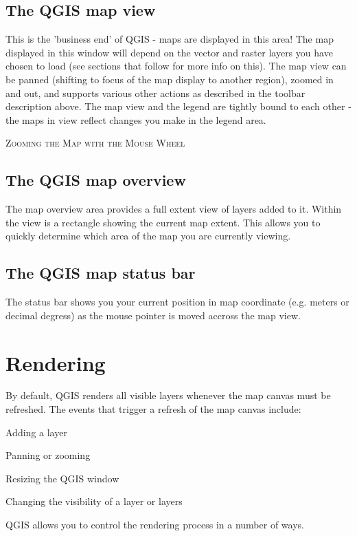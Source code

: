 \subsection{The QGIS map view}
This is the 'business end' of QGIS - maps are displayed in this area! The map
displayed in this window will depend on the vector and raster layers you have
chosen to load (see sections that follow for more info on this). The map view
can be panned (shifting to focus of the map display to another region), zoomed
in and out, and supports various other actions as described in the toolbar
description above.  The map view and the legend are tightly bound to each
other - the maps in view reflect changes you make in the legend area.  
\begin{Tip}\caption{\textsc{Zooming the Map with the Mouse
Wheel}}
\end{Tip}
\subsection{The QGIS map overview}
The map overview area provides a full extent view of layers added to it. Within the view is a rectangle showing the current map extent. This allows you to quickly determine which area of the map you are currently viewing.

\subsection{The QGIS map status bar} 
The status bar shows you your current position in map coordinate (e.g. meters
or decimal degress) as the mouse pointer is moved accross the map view.

\section{Rendering}\label{subsec:redraw_events}
By default, QGIS renders all visible layers whenever the map canvas must be refreshed. The events that trigger a refresh of the map canvas include:
\begin{compactitem}
\item Adding a layer
\item Panning or zooming
\item Resizing the QGIS window
\item Changing the visibility of a layer or layers
\end{compactitem}
QGIS allows you to control the rendering process in a number of ways.
